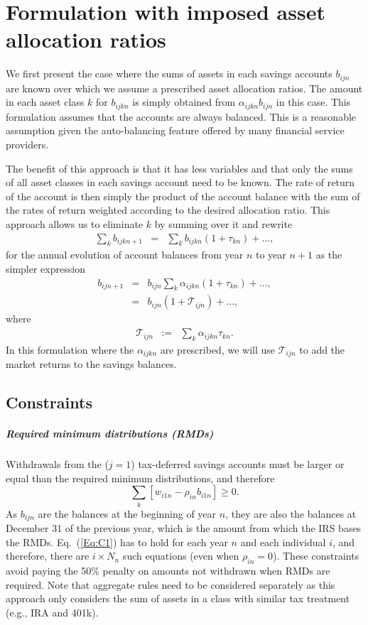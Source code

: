 \documentclass{report}[fleqn,12pt]
\begin{document}
\chapter{Formulation with imposed asset allocation ratios}
We first present the case where the sums of assets in each savings accounts $b_{ijn}$ are known
over which we assume a prescribed asset allocation ratios.
The amount in each asset class $k$ for $b_{ijkn}$ is simply obtained
from $\alpha_{ijkn} b_{ijn}$ in this case.
This formulation assumes that the accounts are always balanced. This is
a reasonable assumption given the auto-balancing feature offered by many financial service
providers.

The benefit of this approach is that it has less variables and that only the sums of
all asset classes in each savings account need to be known. The rate of return
of the account is then simply the product of the account balance with the sum of
the rates of return weighted according to the desired allocation ratio.
This approach allows us to eliminate $k$ by summing over it and rewrite
\begin{eqnarray}
	\sum_k b_{ijkn+1} &=& \sum_k b_{ijkn} (1 + \tau_{kn}) + \ldots ,
\end{eqnarray}
for the annual evolution of account balances from year $n$ to year $n+1$
as the simpler expression 
\begin{eqnarray}
	b_{ijn+1} &=& b_{ijn} \sum_k \alpha_{ijkn} (1 + \tau_{kn}) + \ldots ,\nonumber \\
		  &=& b_{ijn} (1 + \mathcal{T}_{ijn}) + \ldots ,
\end{eqnarray}
where
\begin{eqnarray}
	\label{Eq:Tau1}
	\mathcal{T}_{ijn} &:=& \sum_k \alpha_{ijkn} \tau_{kn}.
\end{eqnarray}
In this formulation where the $\alpha_{ijkn}$ are prescribed,
we will use $\mathcal{T}_{ijn}$ to
add the market returns to the savings balances.

\section{Constraints}
\paragraph*{Required minimum distributions (RMDs)}
	Withdrawals from the ($j=1$) tax-deferred savings accounts must be larger
	or equal than the required minimum distributions, and therefore
	\begin{equation}
		\label{Eq:C1}
		\sum_k [w_{i1n} -  \rho_{in}b_{i1n}] \geq 0.
	\end{equation}
	As $b_{ijn}$ are the balances at the beginning of year $n$, they are also the balances
	at December 31 of the previous year, which is the amount from which the IRS bases the RMDs.
	Eq.~(\ref{Eq:C1}) has to hold for each year $n$ and each individual $i$, and therefore, there
	are $i\times N_n$ such equations (even when $\rho_{in} = 0$).
	These constraints avoid paying the 50\% penalty
	on amounts not withdrawn when RMDs are required.
	Note that aggregate rules need to be considered separately as this approach only considers
	the sum of assets in a class with similar tax treatment (e.g., IRA and 401k).
\end{document}

